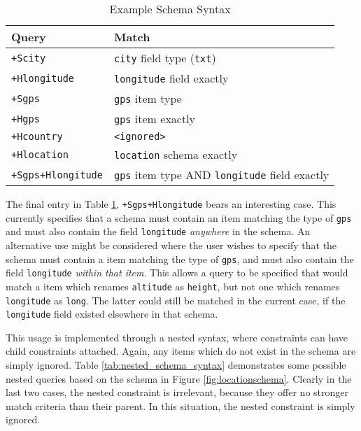 \documentclass[12pt,twoside,notitlepage]{report}
\begin{document}
\begin{table}
\centering

\begin{tabular}{l l}
\hline\hline
Query & Match \\
\hline

{\tt +Scity}		& {\tt city} field type ({\tt txt}) \\
{\tt +Hlongitude}	& {\tt longitude} field exactly \\

{\tt +Sgps}			& {\tt gps} item type \\
{\tt +Hgps}			& {\tt gps} item exactly \\

{\tt +Hcountry}		& {\tt <ignored>} \\
{\tt +Hlocation}	& {\tt location} schema exactly \\

{\tt +Sgps+Hlongitude}	& {\tt gps} item type AND {\tt longitude} field exactly \\

\hline
\end{tabular}

\caption{Example Schema Syntax}
\label{tab:example_schema_syntax}
\end{table}

The final entry in Table \ref{tab:example_schema_syntax}, {\tt +Sgps+Hlongitude} bears an interesting case. 
This currently specifies that a schema must contain an item matching the type of {\tt gps} and must also contain the field {\tt longitude} {\sl anywhere} in the schema. 
An alternative use might be considered where the user wishes to specify that the schema must contain a item matching the type of {\tt gps}, and must also contain the field {\tt longitude} {\sl within that item}. 
This allows a query to be specified that would match a item which renames {\tt altitude} as {\tt height}, but not one which renames {\tt longitude} as {\tt long}. 
The latter could still be matched in the current case, if the {\tt longitude} field existed elsewhere in that schema. 

This usage is implemented through a nested syntax, where constraints can have child constraints attached. 
Again, any items which do not exist in the schema are simply ignored. 
Table \ref{tab:nested_schema_syntax} demonstrates some possible nested queries based on the schema in Figure \ref{fig:locationschema}. 
Clearly in the last two cases, the nested constraint is irrelevant, because they offer no stronger match criteria than their parent. 
In this situation, the nested constraint is simply ignored.
\end{document}
